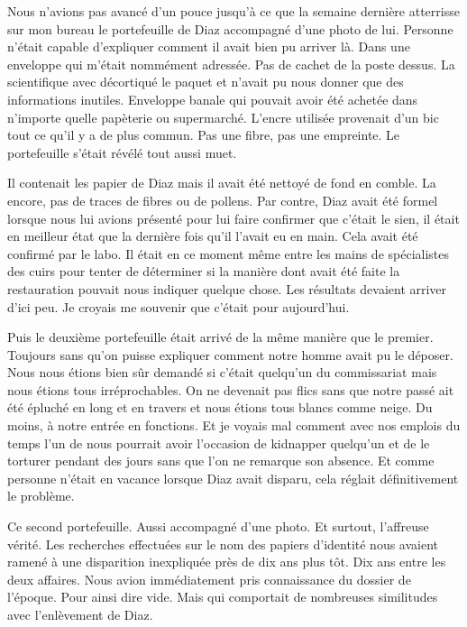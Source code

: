 Nous n'avions pas avancé d'un pouce jusqu'à ce que la semaine dernière atterrisse sur mon bureau le portefeuille de 
Diaz accompagné d'une photo de lui. Personne n'était capable d'expliquer comment il avait bien pu arriver là. Dans une 
enveloppe qui m'était nommément adressée. Pas de cachet de la poste dessus. La scientifique avec décortiqué le paquet 
et n'avait pu nous donner que des informations inutiles. Enveloppe banale qui pouvait avoir été achetée dans n'importe 
quelle papèterie ou supermarché. L'encre utilisée provenait d'un bic tout ce qu'il y a de plus commun.  Pas une fibre, 
pas une empreinte. Le portefeuille s'était révélé tout aussi muet.

Il contenait les papier de Diaz mais il avait été nettoyé de fond en comble. La encore, pas de traces de fibres ou de 
pollens. Par contre, Diaz avait été formel lorsque nous lui avions présenté pour lui faire confirmer que c'était le 
sien, il était en meilleur état que la dernière fois qu'il l'avait eu en main. Cela avait été confirmé par le labo. Il 
était en ce moment même entre les mains de spécialistes des cuirs pour tenter de déterminer si la manière dont avait été 
faite la restauration pouvait nous indiquer quelque chose. Les résultats devaient arriver d'ici peu. Je croyais me 
souvenir que c'était pour aujourd'hui.

Puis le deuxième portefeuille était arrivé de la même manière que le premier. Toujours sans qu'on puisse expliquer 
comment notre homme avait pu le déposer. Nous nous étions bien sûr demandé si c'était quelqu'un du commissariat mais 
nous étions tous irréprochables. On ne devenait pas flics sans que notre passé ait été épluché en long et en travers et 
nous étions tous blancs comme neige. Du moins, à notre entrée en fonctions. Et je voyais mal comment avec nos emplois 
du temps l'un de nous pourrait avoir l'occasion de kidnapper quelqu'un et de le torturer pendant des jours sans que 
l'on ne remarque son absence. Et comme personne n'était en vacance lorsque Diaz avait disparu, cela réglait 
définitivement le problème.

Ce second portefeuille. Aussi accompagné d'une photo. Et surtout, l'affreuse vérité. Les recherches effectuées sur le 
nom des papiers d'identité nous avaient ramené à une disparition inexpliquée près de dix ans plus tôt. Dix ans entre 
les deux affaires. Nous avion immédiatement pris connaissance du dossier de l'époque. Pour ainsi dire vide. Mais qui 
comportait de nombreuses similitudes avec l'enlèvement de Diaz.

